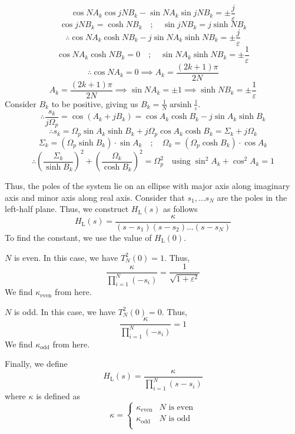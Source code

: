 \documentclass{article}
\theoremstyle{definition}
\DeclareMathOperator{\arcsinh}{arsinh}
\begin{document}
\[
    \cos NA_k \cos jNB_k - \sin NA_k \sin jNB_k = \pm \frac{j}{\varepsilon}
\]
\[
    \cos jNB_k = \cosh NB_k \quad ; \quad \sin jNB_k = j \sinh NB_k
\]
\[
    \therefore \cos NA_k \cosh NB_k - j \sin NA_k \sinh NB_k = \pm \frac{j}{\varepsilon}
\]
\[
    \cos NA_k \cosh NB_k = 0 \quad ; \quad \sin NA_k \sinh NB_k = \pm \frac{1}{\varepsilon}
\]
\[
    \therefore \cos NA_k = 0 \implies \boxed{A_k = \frac{(2k+1) \pi}{2N}} 
\]
\[
    A_k = \frac{(2k+1) \pi}{2N} \implies \sin NA_k = \pm 1 \implies \sinh NB_k = \pm \frac{1}{\varepsilon}
\]
Consider $B_k$ to be positive, giving us $B_k = \frac{1}{N} \arcsinh \frac{1}{\varepsilon} $. 
\[
    \therefore \frac{s_k}{j \Omega_p} = \cos ( A_k + j B_k ) = \cos A_k \cosh B_k - j \sin A_k \sinh B_k
\]
\[
    \therefore \boxed{s_k = \Omega_p \sin A_k \sinh B_k + j \Omega_p \cos A_k \cosh B_k} = \Sigma_k + j \Omega_k
\]
\[
    \Sigma_k = (\Omega_p \sinh B_k) \cdot \sin A_k \quad ; \quad \Omega_k = (\Omega_p \cosh B_k) \cdot \cos A_k
\]
\[
    \therefore \boxed{\left( \frac{\Sigma_k}{\sinh B_k} \right)^2 +  \left( \frac{\Omega_k}{\cosh B_k} \right)^2 = \Omega_p^2} \quad \text{using} \; \sin^2 A_k + \cos^2 A_k = 1
\]

Thus, the poles of the system lie on an ellipse with major axis along imaginary axis and minor axis along real axis. Consider that $s_1 , \ldots s_N$ are the poles in the left-half plane. Thus, we construct $H_{\text{L}}(s)$ as follows
\[  
    H_{\text{L}}(s) = \frac{\kappa}{(s-s_1)(s-s_2) \ldots (s-s_N)}
\]
To find the constant, we use the value of $H_{\text{L}}(0)$.
\begin{case}
    \item $N$ is even. In this case, we have $T_N^2(0) = 1$. Thus, 
    \[
        \frac{\kappa}{\prod\limits_{i=1}^{N} (-s_i)} = \frac{1}{\sqrt{1 + \varepsilon^2}}
    \]  
    We find $\kappa_{\text{even}}$ from here. 
    \item $N$ is odd. In this case, we have $T_N^2(0) = 0$. Thus,
    \[
         \frac{\kappa}{\prod\limits_{i=1}^{N} (-s_i)} = 1
    \]
    We find $\kappa_{\text{odd}}$ from here.
\end{case}

Finally, we define 
\[
    H_{\text{L}}(s) = \frac{\kappa}{\prod\limits_{i=1}^{N} (s-s_i)}
\]
where $\kappa$ is defined as 
\[
    \kappa = 
    \begin{cases}
    \kappa_{\text{even}} & N \text{ is even}\\
    \kappa_{\text{odd}} & N \text{ is odd}\\
    \end{cases}
\]
\end{document}
